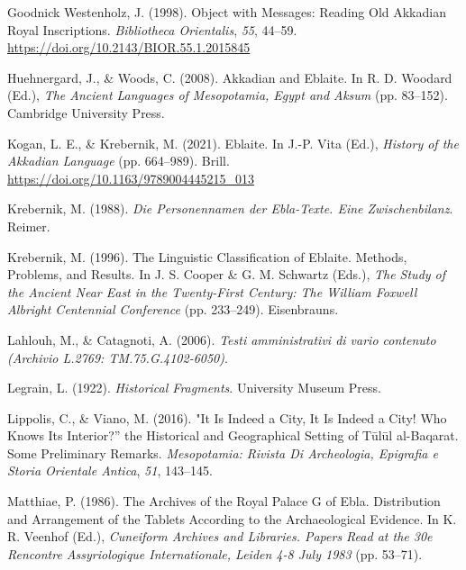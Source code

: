 \documentclass[
]{book}
\newlength{\cslhangindent}
\newlength{\cslentryspacingunit} %
\newenvironment{CSLReferences}[2] %
 {%
  \setlength{\parindent}{0pt}
  \ifodd #1
  \let\oldpar\par
  \def\par{\hangindent=\cslhangindent\oldpar}
  \fi
  \setlength{\parskip}{#2\cslentryspacingunit}
 }%
 {}
\begin{document}
\begin{CSLReferences}{1}{0}
\leavevmode{}%
Goodnick Westenholz, J. (1998). Object with {Messages}: {Reading Old Akkadian Royal Inscriptions}. \emph{Bibliotheca Orientalis}, \emph{55}, 44--59. \url{https://doi.org/10.2143/BIOR.55.1.2015845}

\leavevmode{}%
Huehnergard, J., \& Woods, C. (2008). Akkadian and {Eblaite}. In R. D. Woodard (Ed.), \emph{The {Ancient Languages} of {Mesopotamia}, {Egypt} and {Aksum}} (pp. 83--152). Cambridge University Press.

\leavevmode{}%
Kogan, L. E., \& Krebernik, M. (2021). Eblaite. In J.-P. Vita (Ed.), \emph{History of the {Akkadian Language}} (pp. 664--989). Brill. \url{https://doi.org/10.1163/9789004445215_013}

\leavevmode{}%
Krebernik, M. (1988). \emph{Die Personennamen der Ebla-Texte. Eine Zwischenbilanz}. Reimer.

\leavevmode{}%
Krebernik, M. (1996). The {Linguistic Classification} of {Eblaite}. {Methods}, {Problems}, and {Results}. In J. S. Cooper \& G. M. Schwartz (Eds.), \emph{The {Study} of the {Ancient Near East} in the {Twenty-First Century}: {The William Foxwell Albright Centennial Conference}} (pp. 233--249). Eisenbrauns.

\leavevmode{}%
Lahlouh, M., \& Catagnoti, A. (2006). \emph{Testi amministrativi di vario contenuto (Archivio L.2769: TM.75.G.4102-6050)}.

\leavevmode{}%
Legrain, L. (1922). \emph{Historical {Fragments}}. University Museum Press.

\leavevmode{}%
Lippolis, C., \& Viano, M. (2016). "{It Is Indeed} a {City}, {It Is Indeed} a {City}! {Who Knows Its Interior}?'' the {Historical} and {Geographical Setting} of {Tūlūl} al-{Baqarat}. {Some Preliminary Remarks}. \emph{Mesopotamia: Rivista Di Archeologia, Epigrafia e Storia Orientale Antica}, \emph{51}, 143--145.

\leavevmode{}%
Matthiae, P. (1986). The {Archives} of the {Royal Palace G} of {Ebla}. {Distribution} and {Arrangement} of the {Tablets According} to the {Archaeological Evidence}. In K. R. Veenhof (Ed.), \emph{Cuneiform {Archives} and {Libraries}. {Papers Read} at the 30e {Rencontre Assyriologique Internationale}, {Leiden} 4-8 {July} 1983} (pp. 53--71).


\end{CSLReferences}
\end{document}
